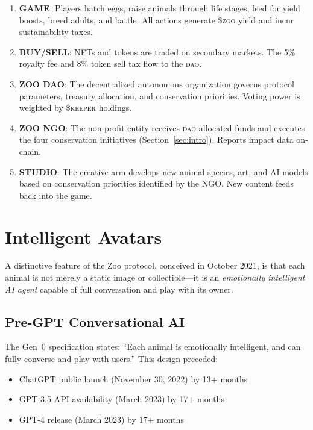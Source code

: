 \documentclass[11pt,letterpaper]{article}
\newcommand{\DAO}{\textsc{dao}}
\newcommand{\ZOO}{\$\textsc{zoo}}
\newcommand{\KEEPER}{\$\textsc{keeper}}
\begin{document}
\begin{enumerate}
    \item \textbf{GAME}: Players hatch eggs, raise animals through life stages, feed for yield boosts, breed adults, and battle.  All actions generate \ZOO{} yield and incur sustainability taxes.
    \item \textbf{BUY/SELL}: NFTs and tokens are traded on secondary markets.  The 5\% royalty fee and 8\% token sell tax flow to the \DAO{}.
    \item \textbf{ZOO DAO}: The decentralized autonomous organization governs protocol parameters, treasury allocation, and conservation priorities.  Voting power is weighted by \KEEPER{} holdings.
    \item \textbf{ZOO NGO}: The non-profit entity receives \DAO{}-allocated funds and executes the four conservation initiatives (Section~\ref{sec:intro}).  Reports impact data on-chain.
    \item \textbf{STUDIO}: The creative arm develops new animal species, art, and AI models based on conservation priorities identified by the NGO.  New content feeds back into the game.
\end{enumerate}

\section{Intelligent Avatars}
\label{sec:avatars}

A distinctive feature of the Zoo protocol, conceived in October 2021, is that each animal is not merely a static image or collectible---it is an \emph{emotionally intelligent AI agent} capable of full conversation and play with its owner.

\subsection{Pre-GPT Conversational AI}

The Gen~0 specification states: ``Each animal is emotionally intelligent, and can fully converse and play with users.''  This design preceded:

\begin{itemize}
    \item ChatGPT public launch (November 30, 2022) by 13+ months
    \item GPT-3.5 API availability (March 2023) by 17+ months
    \item GPT-4 release (March 2023) by 17+ months
\end{itemize}
\end{document}
